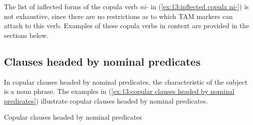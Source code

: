 The list of inflected forms of the copula verb \textit{ni-} in (\ref{ex:13:inflected copula ni-}) is not exhaustive, since there are no restrictions as to which TAM markers can attach to this verb. Examples of these copula verbs in context are provided in the sections below.

\subsection{Clauses headed by nominal predicates}
\label{subsec: copular clauses headed by nominal predicates}

In copular clauses headed by nominal predicates, the characteristic of the subject is a noun phrase. The examples in (\ref{ex:13:copular clauses headed by nominal predicates}) illustrate copular clauses headed by nominal predicates.


\ea\label{ex:13:copular clauses headed by nominal predicates}
{Copular clauses headed by nominal predicates}

    \z
\z

